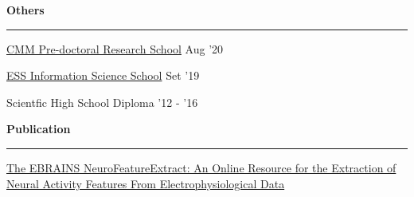 \documentclass[11pt,letterpaper]{article}
\begin{document}
\begin{justify}
      \begin{minipage}[t]{9.1cm}
            \textbf{Others}\strut
            \hrule
            \vspace{0.2cm}
            \begin{itemize}[label={}, leftmargin=0pt]
                  \begin{item}
                        \href{https://cmmrs2020.mpi-sws.org/}{CMM Pre-doctoral Research School}
                        \hfill
                        Aug '20
                  \end{item}
                  \begin{item}
                        \href{http://einfose.ffos.hr/summer-school/}{ESS Information Science School}
                        \hfill
                        Set '19
                  \end{item}
                  \begin{item}
                        Scientfic High School Diploma
                        \hfill
                        '12 - '16
                  \end{item}
            \end{itemize}
      \end{minipage}
      \hfill
      \begin{minipage}[t]{9.1cm}
            \textbf{Publication}\strut
            \hrule
            \vspace{0.2cm}
            \begin{itemize}[label={}, leftmargin=0pt]
                  \begin{item}
                        \href{https://www.frontiersin.org/articles/10.3389/fninf.2021.713899/full}{The EBRAINS NeuroFeatureExtract: An Online Resource for the Extraction of Neural Activity Features From Electrophysiological Data}
                  \end{item}
            \end{itemize}
      \end{minipage}


\end{justify}
\end{document}
